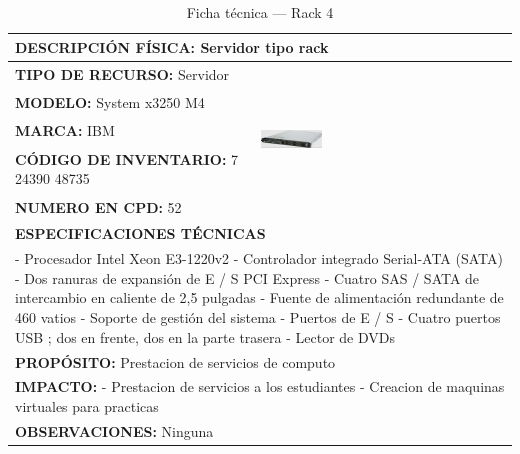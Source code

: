 \begin{table}[H]
\centering
\caption{Ficha técnica --- Rack 4}
\label{tab:rack-4}
\begin{tabular}{|p{}|p{}|}
\hline
\multicolumn{2}{|l|}{\textbf{DESCRIPCIÓN FÍSICA:} Servidor tipo rack} \\ \hline
\textbf{TIPO DE RECURSO:} Servidor & 
\multirow{5}{*}{\includegraphics[width=0.25\textwidth,height=4cm,keepaspectratio]{tablas-images/cp1/racks/rack-1.png}} \\ \cline{1-1}
\textbf{MODELO:} System x3250 M4 & \\ \cline{1-1}
\textbf{MARCA:} IBM & \\ \cline{1-1}
\textbf{CÓDIGO DE INVENTARIO:} 7 24390 48735 & \\ \cline{1-1}
\textbf{NUMERO EN CPD:} 52 & \\ \hline
\multicolumn{2}{|l|}{\textbf{ESPECIFICACIONES TÉCNICAS}} \\ \hline
\multicolumn{2}{|p{0.95\textwidth}|}{
\footnotesize
- Procesador Intel Xeon E3-1220v2
- Controlador integrado Serial-ATA (SATA)
- Dos ranuras de expansión de E / S PCI Express
- Cuatro SAS / SATA de intercambio en caliente de 2,5 pulgadas
- Fuente de alimentación redundante de 460 vatios
- Soporte de gestión del sistema
- Puertos de E / S
- Cuatro puertos USB ; dos en frente, dos en la parte trasera
- Lector de DVDs
} \\ \hline
\multicolumn{2}{|l|}{\textbf{PROPÓSITO:} Prestacion de servicios de computo} \\ \hline
\multicolumn{2}{|p{0.9\textwidth}|}{\textbf{IMPACTO:} - Prestacion de servicios a los estudiantes
- Creacion de maquinas virtuales para practicas} \\ \hline
\multicolumn{2}{|p{0.9\textwidth}|}{\textbf{OBSERVACIONES:} Ninguna} \\ \hline
\end{tabular}
\end{table}


